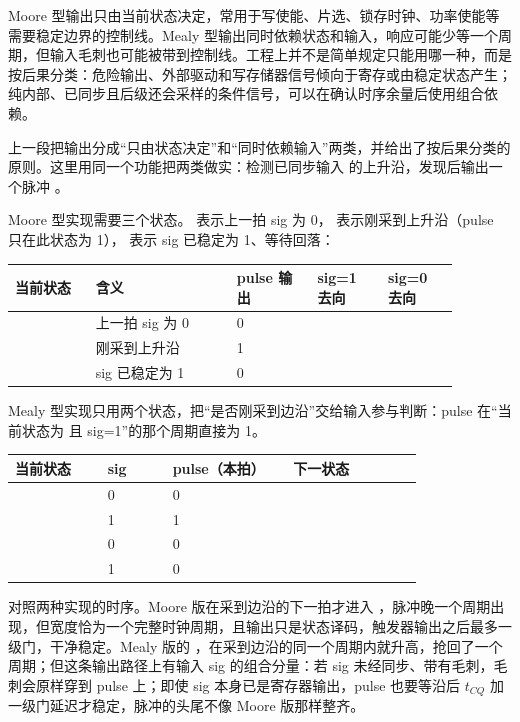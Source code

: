 Moore 型输出只由当前状态决定，常用于写使能、片选、锁存时钟、功率使能等需要稳定边界的控制线。Mealy 型输出同时依赖状态和输入，响应可能少等一个周期，但输入毛刺也可能被带到控制线。工程上并不是简单规定只能用哪一种，而是按后果分类：危险输出、外部驱动和写存储器信号倾向于寄存或由稳定状态产生；纯内部、已同步且后级还会采样的条件信号，可以在确认时序余量后使用组合依赖。


上一段把输出分成“只由状态决定”和“同时依赖输入”两类，并给出了按后果分类的原则。这里用同一个功能把两类做实：检测已同步输入  的上升沿，发现后输出一个脉冲 。

Moore 型实现需要三个状态。 表示上一拍 sig 为 0， 表示刚采到上升沿（pulse 只在此状态为 1）， 表示 sig 已稳定为 1、等待回落：

\begin{longtable}{L{0.16\linewidth}L{0.28\linewidth}L{0.16\linewidth}L{0.14\linewidth}L{0.14\linewidth}}
\toprule
当前状态 & 含义 & pulse 输出 & sig=1 去向 & sig=0 去向 \\
\midrule
{} & 上一拍 sig 为 0 & 0 &  &  \\\tablerowrule
{} & 刚采到上升沿 & 1 &  &  \\\tablerowrule
{} & sig 已稳定为 1 & 0 &  &  \\
\bottomrule
\end{longtable}

Mealy 型实现只用两个状态，把“是否刚采到边沿”交给输入参与判断：pulse 在“当前状态为  且 sig=1”的那个周期直接为 1。

\begin{longtable}{L{0.20\linewidth}L{0.14\linewidth}L{0.26\linewidth}L{0.28\linewidth}}
\toprule
当前状态 & sig & pulse（本拍） & 下一状态 \\
\midrule
{} & 0 & 0 &  \\\tablerowrule
{} & 1 & 1 &  \\\tablerowrule
{} & 0 & 0 &  \\\tablerowrule
{} & 1 & 0 &  \\
\bottomrule
\end{longtable}

对照两种实现的时序。Moore 版在采到边沿的下一拍才进入 ，脉冲晚一个周期出现，但宽度恰为一个完整时钟周期，且输出只是状态译码，触发器输出之后最多一级门，干净稳定。Mealy 版的 ，在采到边沿的同一个周期内就升高，抢回了一个周期；但这条输出路径上有输入 sig 的组合分量：若 sig 未经同步、带有毛刺，毛刺会原样穿到 pulse 上；即使 sig 本身已是寄存器输出，pulse 也要等沿后 $t_{CQ}$ 加一级门延迟才稳定，脉冲的头尾不像 Moore 版那样整齐。


